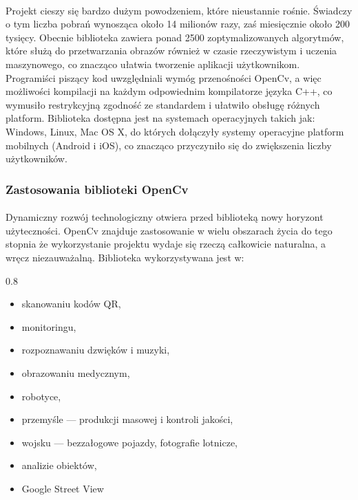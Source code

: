\documentclass[a4paper,12pt]{article}
\newcommand\spacingInSimpleItemize{0.8}
\begin{document}
			\paragraph{\indent} Projekt cieszy się bardzo dużym powodzeniem, które nieustannie rośnie. Świadczy o tym liczba pobrań 
				wynosząca około 14 milionów razy, zaś miesięcznie około 200 tysięcy. Obecnie biblioteka zawiera ponad 2500 zoptymalizowanych algorytmów, 
				które służą do przetwarzania obrazów również w czasie rzeczywistym i uczenia maszynowego, co znacząco ułatwia tworzenie aplikacji użytkownikom. 
				Programiści piszący kod uwzględniali wymóg przenośności OpenCv, a więc możliwości kompilacji na każdym odpowiednim kompilatorze języka C++, 
				co wymusiło restrykcyjną zgodność ze standardem i ułatwiło obsługę różnych platform. Biblioteka dostępna jest na systemach operacyjnych takich jak: 
				Windows, Linux, Mac OS X, do których dołączyły systemy operacyjne platform mobilnych (Android i iOS), co znacząco przyczyniło się do zwiększenia liczby użytkowników.

		\subsubsection{Zastosowania biblioteki OpenCv}
			\paragraph{\indent} Dynamiczny rozwój technologiczny otwiera przed biblioteką nowy horyzont użyteczności. 
				OpenCv znajduje zastosowanie w wielu obszarach życia do tego stopnia że wykorzystanie projektu wydaje się rzeczą całkowicie naturalna,
				a wręcz niezauważalną. Biblioteka wykorzystywana jest w:
			
			    \begin{spacing}{\spacingInSimpleItemize}
			        \begin{itemize}
        				\item skanowaniu kodów QR,
        				\item monitoringu,
        				\item rozpoznawaniu dzwięków i muzyki,
        				\item obrazowaniu medycznym,
        				\item robotyce,	
        				\item przemyśle --- produkcji masowej i kontroli jakości,
        				\item wojsku --- bezzałogowe pojazdy, fotografie lotnicze,
				        \item analizie obiektów,
				        \item Google Street View
		            \end{itemize}
                \end{spacing}
    
\end{document}
